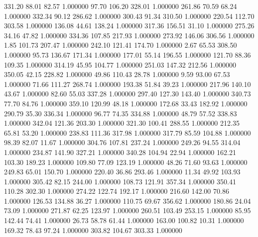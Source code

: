     331.20     88.01     82.57  1.000000
     97.70    106.20    328.01  1.000000
    261.86     70.59     68.24  1.000000
    332.34     90.12    286.62  1.000000
    300.43     91.34    310.50  1.000000
    220.54    112.70    303.58  1.000000
    136.08     44.61    138.24  1.000000
    317.36    156.51     31.10  1.000000
    275.26     34.16     47.82  1.000000
    334.36    107.85    217.93  1.000000
    273.92    146.06    306.56  1.000000
      1.85    101.73    207.47  1.000000
    242.10    121.41    174.70  1.000000
      2.67     65.53    308.50  1.000000
     95.73    136.67    171.34  1.000000
    177.01     55.14    196.55  1.000000
    121.70     88.36    109.35  1.000000
    314.19     45.95    104.77  1.000000
    251.03    147.32    212.56  1.000000
    350.05     42.15    228.82  1.000000
     49.86    110.43     28.78  1.000000
      9.59     93.00     67.53  1.000000
     71.66    111.27    268.74  1.000000
    193.38     51.84     39.23  1.000000
    217.96    140.10     43.67  1.000000
     82.60     55.03    337.28  1.000000
    297.40    127.30    143.40  1.000000
    340.73     77.70     84.76  1.000000
    359.10    120.99     48.18  1.000000
    172.68     33.43    182.92  1.000000
    290.79     35.30    336.34  1.000000
     96.77     74.35    334.88  1.000000
     48.79     57.52    338.83  1.000000
    342.04    121.36    203.30  1.000000
    321.30    100.41    288.55  1.000000
    212.35     65.81     53.20  1.000000
    238.83    111.36    317.98  1.000000
    317.79     85.59    104.88  1.000000
     98.39     82.07     11.67  1.000000
    304.76    107.81    237.24  1.000000
    249.26     94.55    314.04  1.000000
    234.87    141.90    327.21  1.000000
    340.28    104.94     22.94  1.000000
    162.21    103.30    189.23  1.000000
    109.80     77.09    123.19  1.000000
     48.26     71.60     93.63  1.000000
    249.83     65.01    150.70  1.000000
    220.40     36.86    293.46  1.000000
     11.34     49.92    103.93  1.000000
    305.42     82.15    244.00  1.000000
    108.73    121.91    357.34  1.000000
    350.41    110.28    302.30  1.000000
    274.22    122.74    192.17  1.000000
    216.60    142.00     70.86  1.000000
    126.53    134.88     36.27  1.000000
    110.75     69.67    356.62  1.000000
    180.86     24.04     73.09  1.000000
    271.87     62.25    123.97  1.000000
    260.51    103.49    253.15  1.000000
     85.95    142.44     74.41  1.000000
     26.73     58.78     61.44  1.000000
    163.00    100.82     10.31  1.000000
    169.32     78.43     97.24  1.000000
    303.82    104.67    303.33  1.000000
